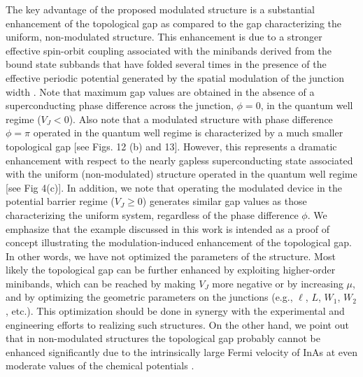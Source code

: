 \documentclass[twocolumn,aps,prb,nofootinbib]{revtex4-2}
\begin{document}
The key advantage of the proposed modulated structure is a substantial enhancement of the topological gap as compared to the gap characterizing the uniform, non-modulated structure. This enhancement is due to a stronger effective spin-orbit coupling associated with the  minibands derived from the bound state subbands  that have folded several times in the presence of the effective periodic potential generated by the spatial modulation of the junction width \cite{Woods2020b}. Note that  maximum gap values are obtained in the absence of a superconducting phase difference  across the junction, $\phi = 0$, in the quantum well regime ($V_J < 0$). Also note that a modulated structure with phase difference $\phi = \pi$ operated in the quantum well regime is characterized by a much smaller topological gap [see Figs. 12 (b) and 13]. However, this represents a dramatic enhancement with respect to the nearly gapless superconducting state associated with the uniform (non-modulated) structure operated in the quantum well regime [see Fig 4(c)]. In addition, we note that operating the modulated device in the potential barrier regime ($V_J\geq 0$) generates similar gap values as those characterizing the uniform system, regardless of the phase difference $\phi$. 
We emphasize that the example discussed in this work is intended as a proof of concept illustrating the modulation-induced enhancement of the topological gap. In other words, we have not optimized the parameters of the structure. 
 Most likely  the topological gap can be further enhanced by exploiting  higher-order minibands, which can be  reached by making $V_J$  more negative or by increasing $\mu$, and by optimizing the geometric parameters on the junctions (e.g., $\ell$, $L$, $W_1$, $W_2$, etc.). This optimization should be done in synergy with the experimental and engineering efforts to realizing such structures.  On the other hand, we point out that in non-modulated structures the topological gap probably cannot be enhanced significantly due to the intrinsically large Fermi velocity of InAs at even moderate values of the chemical potentials \cite{Pientka2017}. 
 
\end{document}
